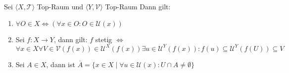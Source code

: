 \mprop{}
{
    Sei $\langle X, \mathcal{T} \rangle$ Top-Raum 
    und $\langle Y, \mathcal{V} \rangle$ Top-Raum
    Dann gilt:
\begin{enumerate}
    \item $\forall O \in X \Leftrightarrow (\forall x \in O: O \in \mathscr{U}(x))$
    \item Sei $f : X \to Y$, dann gilt: $f$ stetig $\Leftrightarrow$
    $$
    \forall x \in X  \forall V \in \mathcal{V}(f(x)) \in \mathscr{U}^X(f(x))
    \exists u \in \mathscr{U}^Y(f(x)): f(u) \subseteq \mathscr{U}^Y(f(U)) 
    \subseteq V
    $$
    \item Sei $A \in X$, dann ist $\overline{A} = \{ x \in X \mid \forall u
     \in \mathscr{U}(x) : U \cap A \neq \emptyset \}$
\end{enumerate}
}

